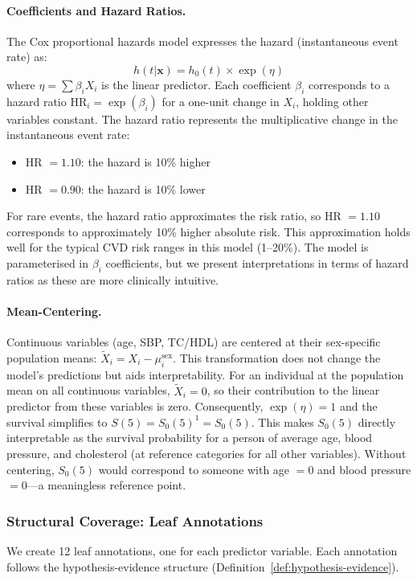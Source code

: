 \documentclass{article}
\begin{document}
\paragraph{Coefficients and Hazard Ratios.}
The Cox proportional hazards model expresses the hazard (instantaneous event rate) as:
\[
h(t|\mathbf{x}) = h_0(t) \times \exp(\eta)
\]
where $\eta = \sum \beta_i X_i$ is the linear predictor. Each coefficient $\beta_i$ corresponds to a hazard ratio $\text{HR}_i = \exp(\beta_i)$ for a one-unit change in $X_i$, holding other variables constant. The hazard ratio represents the multiplicative change in the instantaneous event rate:
\begin{itemize}
    \item HR $= 1.10$: the hazard is 10\% higher
    \item HR $= 0.90$: the hazard is 10\% lower
\end{itemize}
For rare events, the hazard ratio approximates the risk ratio, so HR $= 1.10$ corresponds to approximately 10\% higher absolute risk. This approximation holds well for the typical CVD risk ranges in this model (1--20\%). The model is parameterised in $\beta_i$ coefficients, but we present interpretations in terms of hazard ratios as these are more clinically intuitive.

\paragraph{Mean-Centering.}
Continuous variables (age, SBP, TC/HDL) are centered at their sex-specific population means: $\tilde{X}_i = X_i - \mu_i^{\text{sex}}$. This transformation does not change the model's predictions but aids interpretability. For an individual at the population mean on all continuous variables, $\tilde{X}_i = 0$, so their contribution to the linear predictor from these variables is zero. Consequently, $\exp(\eta) = 1$ and the survival simplifies to $S(5) = S_0(5)^1 = S_0(5)$. This makes $S_0(5)$ directly interpretable as the survival probability for a person of average age, blood pressure, and cholesterol (at reference categories for all other variables). Without centering, $S_0(5)$ would correspond to someone with age $= 0$ and blood pressure $= 0$---a meaningless reference point.
\subsubsection{Structural Coverage: Leaf Annotations}

We create 12 leaf annotations, one for each predictor variable. Each annotation follows the hypothesis-evidence structure (Definition~\ref{def:hypothesis-evidence}).
\end{document}
